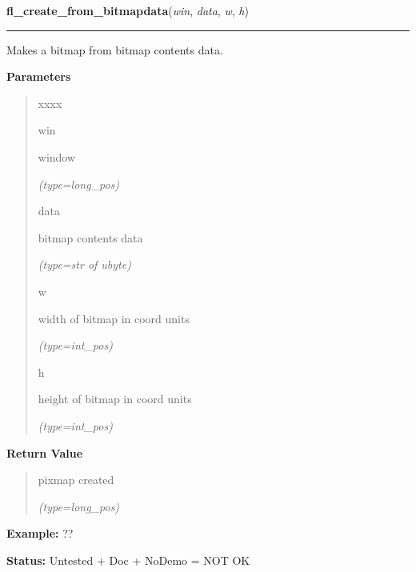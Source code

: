     \label{xformslib:flbitmap:fl_create_from_bitmapdata}

    \vspace{0.5ex}

\hspace{.8\funcindent}\begin{boxedminipage}{\funcwidth}

    \raggedright \textbf{fl\_create\_from\_bitmapdata}(\textit{win}, \textit{data}, \textit{w}, \textit{h})

    \vspace{-1.5ex}

    \rule{\textwidth}{0.5\fboxrule}
\setlength{\parskip}{2ex}
    Makes a bitmap from bitmap contents data.

\setlength{\parskip}{1ex}
      \textbf{Parameters}
      \vspace{-1ex}

      \begin{quote}
        \begin{Ventry}{xxxx}

          \item[win]

          window

            {\it (type=long\_pos)}

          \item[data]

          bitmap contents data

            {\it (type=str of ubyte)}

          \item[w]

          width of bitmap in coord units

            {\it (type=int\_pos)}

          \item[h]

          height of bitmap in coord units

            {\it (type=int\_pos)}

        \end{Ventry}

      \end{quote}

      \textbf{Return Value}
    \vspace{-1ex}

      \begin{quote}
      pixmap created

      {\it (type=long\_pos)}

      \end{quote}

\textbf{Example:} ??



\textbf{Status:} Untested + Doc + NoDemo = NOT OK



    \end{boxedminipage}

